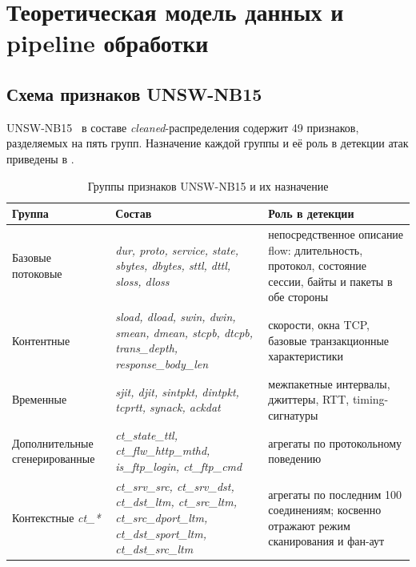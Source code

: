 
\section{Теоретическая модель данных и pipeline обработки}

\subsection{Схема признаков UNSW-NB15}

UNSW-NB15~\cite{moustafa2015unsw, moustafa2016eval, unswportal} в составе
\emph{cleaned}-распределения содержит 49 признаков, разделяемых на пять
групп. Назначение каждой группы и её роль в детекции атак приведены в
.

\begin{table}[H]
\centering
\caption{Группы признаков UNSW-NB15 и их назначение}
\label{tab:unsw-feature-groups}
\renewcommand{\arraystretch}{1.25}
\begin{tabularx}{\linewidth}{@{}lXX@{}}
\toprule
\textbf{Группа} & \textbf{Состав} & \textbf{Роль в детекции} \\
\midrule
Базовые потоковые &
\emph{dur, proto, service, state, sbytes, dbytes, sttl, dttl, sloss, dloss}
&
непосредственное описание flow: длительность, протокол, состояние сессии,
байты и пакеты в обе стороны \\
\addlinespace
Контентные &
\emph{sload, dload, swin, dwin, smean, dmean, stcpb, dtcpb, trans\_depth,
response\_body\_len} &
скорости, окна TCP, базовые транзакционные характеристики \\
\addlinespace
Временные &
\emph{sjit, djit, sintpkt, dintpkt, tcprtt, synack, ackdat} &
межпакетные интервалы, джиттеры, RTT, timing-сигнатуры \\
\addlinespace
Дополнительные сгенерированные &
\emph{ct\_state\_ttl, ct\_flw\_http\_mthd, is\_ftp\_login,
ct\_ftp\_cmd} &
агрегаты по протокольному поведению \\
\addlinespace
Контекстные \emph{ct\_*}&
\emph{ct\_srv\_src, ct\_srv\_dst, ct\_dst\_ltm, ct\_src\_ltm,
ct\_src\_dport\_ltm, ct\_dst\_sport\_ltm, ct\_dst\_src\_ltm} &
агрегаты по последним 100 соединениям; косвенно отражают режим
сканирования и фан-аут \\
\bottomrule
\end{tabularx}
\end{table}

